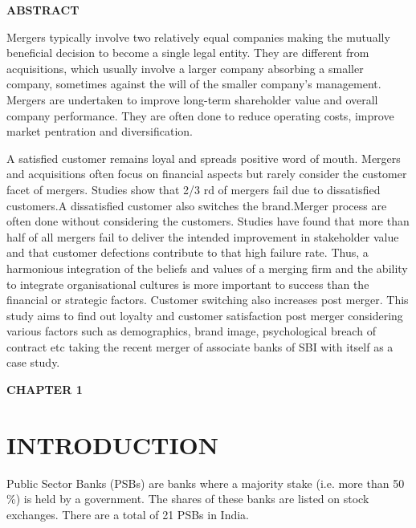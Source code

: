 \documentclass[a4paper, 12pt]{extarticle}
\begin{document}
{%
\newpage
\begin{center}
\textbf{\fontsize{14}{2} \selectfont ABSTRACT}\\
\end{center}
\par Mergers typically involve two relatively equal companies making the mutually beneficial decision to become a single legal entity. They are different from acquisitions, which usually involve a larger company absorbing a smaller company, sometimes against the will of the smaller company's management. Mergers are undertaken to improve long-term shareholder value and overall company performance. They are often done to reduce operating costs, improve market pentration and diversification.
\par A satisfied customer remains loyal and spreads positive word of mouth. Mergers and acquisitions often focus on financial aspects but rarely consider the customer facet of mergers. Studies show that 2/3 rd of mergers fail due to dissatisfied customers.A dissatisfied customer also switches the brand.Merger process are often done without considering the customers. Studies have found that more than half of all mergers fail to deliver the intended improvement in stakeholder value and that customer defections contribute to that high failure rate. Thus, a harmonious integration of the beliefs and values of a merging firm and the ability to integrate organisational cultures is more important to success than the financial or strategic factors. Customer switching also increases post merger. This study aims to find out loyalty and customer satisfaction post merger considering various factors such as demographics, brand image, psychological breach of contract etc taking the recent merger of associate banks of SBI with itself as a case study.

\newpage

\tableofcontents
\listoffigures
\listoftables

\newpage
{}
\begin{center}
\textbf{\large CHAPTER 1}
\end{center}
\section{INTRODUCTION}
\par Public Sector Banks (PSBs) are banks where a majority stake (i.e. more than 50 \%) is held by a government. The shares of these banks are listed on stock exchanges. There are a total of 21 PSBs in India.

}
\end{document}
